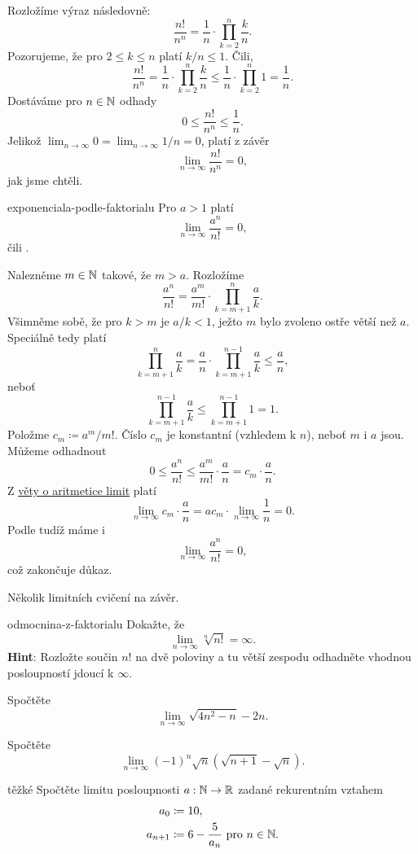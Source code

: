 \begin{lemproof}
 Rozložíme výraz následovně:
 \[
  \frac{n!}{n^{n}} = \frac{1}{n} \cdot \prod_{k=2}^n \frac{k}{n}.
 \]
 Pozorujeme, že pro $2 \leq k \leq n$ platí $k / n \leq 1$. Čili,
 \[
  \frac{n!}{n^{n}} = \frac{1}{n} \cdot \prod_{k=2}^n \frac{k}{n} \leq
  \frac{1}{n} \cdot \prod_{k=2}^n 1 = \frac{1}{n}.
 \]
 Dostáváme pro $n \in \mathbb{N}$ odhady
 \[
  0 \leq \frac{n!}{n^{n}} \leq \frac{1}{n}.
 \]
 Jelikož $\lim_{n \to \infty} 0 = \lim_{n \to \infty} 1 / n = 0$, platí z
  závěr
 \[
  \lim_{n \to \infty} \frac{n!}{n^{n}} = 0,
 \]
 jak jsme chtěli.
\end{lemproof}
\begin{lemma}{}{exponenciala-podle-faktorialu}
 Pro $ a > 1$ platí
 \[
  \lim_{n \to \infty} \frac{a^{n}}{n!} = 0,
 \]
 čili .
\end{lemma}
\begin{lemproof}
 Nalezněme $m \in \mathbb{N}$ takové, že $m > a$. Rozložíme
 \[
  \frac{a^{n}}{n!} = \frac{a^{m}}{m!} \cdot \prod_{k=m+1}^n \frac{a}{k}.
 \]
 Všimněme sobě, že pro $k > m$ je $a / k < 1$, ježto $m$ bylo zvoleno ostře
 větší než $a$. Speciálně tedy platí
 \[
  \prod_{k=m+1}^n \frac{a}{k} = \frac{a}{n} \cdot \prod_{k=m+1}^{n-1}
  \frac{a}{k} \leq \frac{a}{n},
 \]
 neboť
 \[
  \prod_{k=m+1}^{n-1} \frac{a}{k} \leq \prod_{k=m+1}^{n-1} 1 = 1.
 \]
 Položme $c_m \coloneqq a^{m} / m!$. Číslo $c_m$ je konstantní (vzhledem k $n$),
 neboť $m$ i $a$ jsou. Můžeme odhadnout
 \[
  0 \leq \frac{a^{n}}{n!} \leq \frac{a^{m}}{m!} \cdot \frac{a}{n} = c_m \cdot
  \frac{a}{n}.
 \]
 Z \hyperref[thm:aritmetika-limit]{věty o aritmetice limit} platí
 \[
  \lim_{n \to \infty} c_m \cdot \frac{a}{n} = ac_m \cdot \lim_{n \to \infty}
  \frac{1}{n} = 0.
 \]
 Podle  tudíž máme i
 \[
  \lim_{n \to \infty} \frac{a^{n}}{n!} = 0,
 \]
 což zakončuje důkaz.
\end{lemproof}

Několik limitních cvičení na závěr.

\begin{exercise}{}{odmocnina-z-faktorialu}
 Dokažte, že
 \[
  \lim_{n \to \infty} \sqrt[n]{n!} = \infty.
 \]
 \textbf{Hint}: Rozložte součin $n!$ na dvě poloviny a tu větší zespodu
 odhadněte vhodnou posloupností jdoucí k $\infty$.
\end{exercise}

\begin{exercise}{}{}
 Spočtěte
 \[
  \lim_{n \to \infty} \sqrt{4n^2 - n} - 2n.
 \]
\end{exercise}

\begin{exercise}{}{}
 Spočtěte
 \[
  \lim_{n \to \infty} (-1)^{n}\sqrt{n}(\sqrt{n+1}-\sqrt{n}).
 \]
\end{exercise}

\begin{exercise}{těžké}{}
 Spočtěte limitu posloupnosti $a:\mathbb{N} \to \mathbb{R}$ zadané rekurentním vztahem
 \begin{align*}
  a_0 &\coloneqq 10,\\
  a_{n+1} & \coloneqq 6 - \frac{5}{a_n} \text{ pro } n \in \mathbb{N}.
 \end{align*}
\end{exercise}
